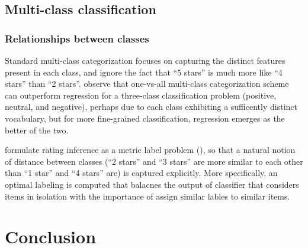 \documentclass{article}
\begin{document}
\begin{multicols}{2}
  \subsection{Multi-class classification}
    \subsubsection{Relationships between classes}
        Standard multi-class categorization focuses on capturing the
distinct features present in each class, and ignore the fact that ``5 stars'' is
much more like ``4 stars'' than ``2 stars''. \cite{Pang2005} observe that
one-vs-all multi-class categorization scheme can outperform regression for a
three-class classification problem (positive, neutral, and negative), perhaps
due to each class exhibiting a sufficently distinct vocabulary, but for more
fine-grained classification, regression emerges as the better of the two.
        
        \cite{Pang2005} formulate rating inference as a metric label
problem (\cite{Kleinberg2002}), so that a natural notion of distance between
classes (``2 stars'' and ``3 stars'' are more similar to each other than ``1
star'' and ``4 stars'' are) is captured explicitly. More specifically, an
optimal labeling is computed that balacnes the output of classifier that
considers items in isolation with the importance of assign similar lables to
similar items.

\section{Conclusion}




\end{multicols}
\end{document}
